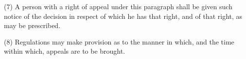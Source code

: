 \documentclass[12pt,a4paper]{article}
\begin{document}

(7) A person with a right of appeal under this paragraph shall be given such notice of the decision in respect of which he has that right, and of that right, as may be prescribed.

(8) Regulations may make provision as to the manner in which, and the time within which, appeals are to be brought.

%


%
%
%
%
%
%
%
\end{document}
